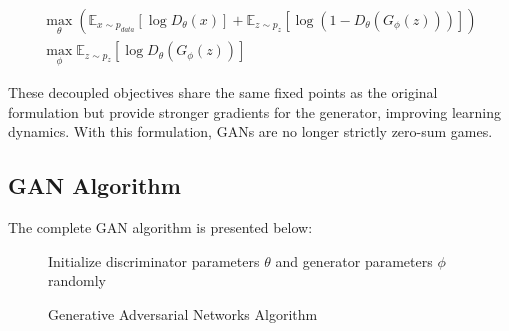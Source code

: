 \begin{align}
  \label{eq:second-value-function} 
  \max_{\theta} \left( \mathbb{E}_{x \sim p_{data}}[\log D_\theta(x)] + \mathbb{E}_{z \sim p_z}[\log(1 - D_\theta(G_\phi(z)))] \right) \\
  \max_{\phi} \mathbb{E}_{z \sim p_z}[\log D_\theta(G_\phi(z))]
\end{align}

These decoupled objectives share the same fixed points as the original formulation but provide stronger gradients for the generator, improving learning dynamics. With this formulation, GANs are no longer strictly zero-sum games.

\subsection{GAN Algorithm}

The complete GAN algorithm is presented below:

\begin{figure}[H] \centering
  \begin{minipage}{0.95\linewidth}
    \begin{algorithm}[H]
      \SetAlgoLined
      Initialize discriminator parameters $\theta$ and generator parameters $\phi$ randomly\;
      \caption{Generative Adversarial Networks Algorithm}
      \label{algo:main-algo}
    \end{algorithm}
  \end{minipage}
\end{figure}

